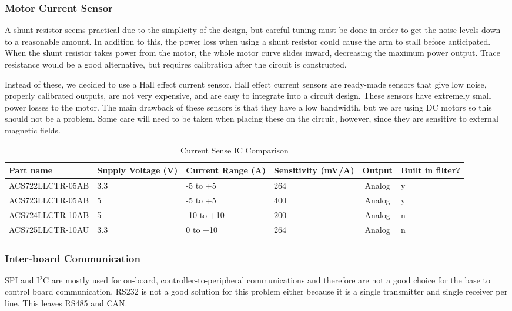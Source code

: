 \subsubsection{Motor Current Sensor}
A shunt resistor seems practical due to the simplicity of the design, but careful tuning must be done in order to get the noise levels down to a reasonable amount. In addition to this, the power loss when using a shunt resistor could cause the arm to stall before anticipated. When the shunt resistor takes power from the motor, the whole motor curve slides inward, decreasing the maximum power output. Trace resistance would be a good alternative, but requires calibration after the circuit is constructed. 

\noindent Instead of these, we decided to use a Hall effect current sensor. Hall effect current sensors are ready-made sensors that give low noise, properly calibrated outputs, are not very expensive, and are easy to integrate into a circuit design. These sensors have extremely small power losses to the motor. The main drawback of these sensors is that they have a low bandwidth, but we are using DC motors so this should not be a problem. Some care will need to be taken when placing these on the circuit, however, since they are sensitive to external magnetic fields.

\begin{table}[H]
	\centering
	\caption{Current Sense IC Comparison}
	\begin{tabular}{|p{4.2cm}|p{1.5cm}|p{2cm}|p{1.7cm}|c|p{1.4cm}|}
\hline
Part name & Supply Voltage (V) & Current Range (A) & Sensitivity (mV/A) & Output & Built in filter? \\
\hline

ACS722LLCTR-05AB & 3.3 & -5 to +5 & 264 & Analog & y \\

ACS723LLCTR-05AB & 5 & -5 to +5 & 400 & Analog & y \\

ACS724LLCTR-10AB & 5 & -10 to +10 & 200 & Analog & n \\

ACS725LLCTR-10AU & 3.3 & 0 to +10 & 264 & Analog & n \\
\hline

\end{tabular}

	\label{tbl:Current Sense IC Comparison}
\end{table}

\subsubsection{Inter-board Communication}
SPI and I$^2$C are mostly used for on-board, controller-to-peripheral communications and therefore are not a good choice for the base to control board communication. RS232 is not a good solution for this problem either because it is a single transmitter and single receiver per line. This leaves RS485 and CAN.

